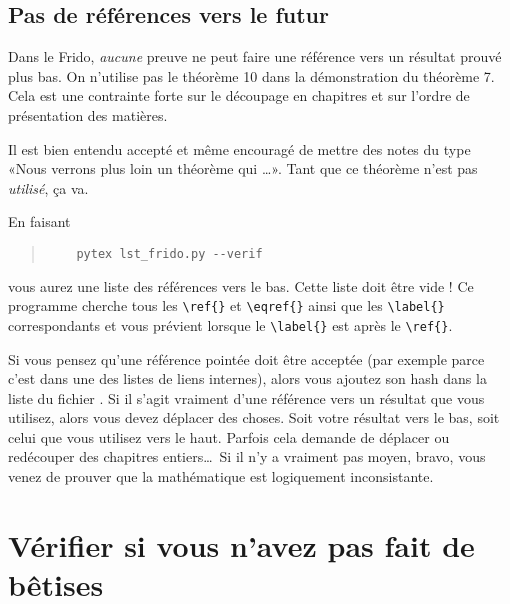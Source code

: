 \subsection{Pas de références vers le futur}

Dans le Frido, \emph{aucune} preuve ne peut faire une référence vers un résultat prouvé plus bas. On n'utilise pas le théorème 10 dans la démonstration du théorème 7. Cela est une contrainte forte sur le découpage en chapitres et sur l'ordre de présentation des matières.

Il est bien entendu accepté et même encouragé de mettre des notes du type «Nous verrons plus loin un théorème qui \ldots». Tant que ce théorème n'est pas \emph{utilisé}, ça va. 

En faisant
\begin{quote}
    \begin{verbatim}
    pytex lst_frido.py --verif
    \end{verbatim}
\end{quote}
vous aurez une liste des références vers le bas. Cette liste doit être vide ! Ce programme cherche tous les \verb+\ref{}+ et \verb+\eqref{}+ ainsi que les \verb+\label{}+ correspondants et vous prévient lorsque le \verb+\label{}+ est après le \verb+\ref{}+.

Si vous pensez qu'une référence pointée doit être acceptée (par exemple parce c'est dans une des listes de liens internes), alors vous ajoutez son hash dans la liste du fichier . Si il s'agit vraiment d'une référence vers un résultat que vous utilisez, alors vous devez déplacer des choses. Soit votre résultat vers le bas, soit celui que vous utilisez vers le haut. Parfois cela demande de déplacer ou redécouper des chapitres entiers\ldots\ Si il n'y a vraiment pas moyen, bravo, vous venez de prouver que la mathématique est logiquement inconsistante.

\section{Vérifier si vous n'avez pas fait de bêtises}

